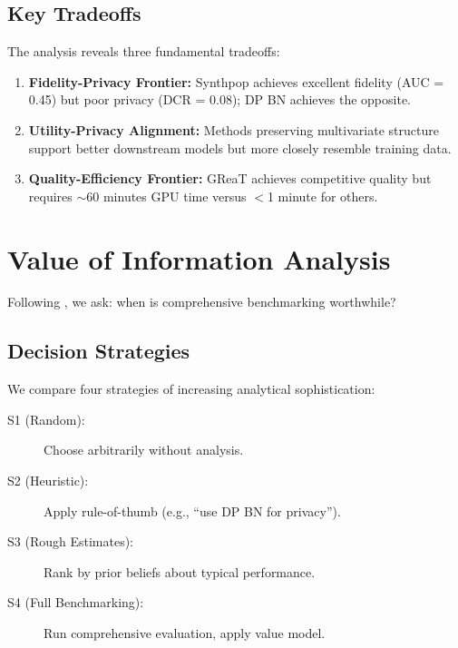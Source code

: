 \documentclass[12pt,a4paper]{article}
\begin{document}
\subsection{Key Tradeoffs}

The analysis reveals three fundamental tradeoffs:

\begin{enumerate}
    \item \textbf{Fidelity-Privacy Frontier:} Synthpop achieves excellent fidelity (AUC = 0.45) but poor privacy (DCR = 0.08); DP BN achieves the opposite.
    
    \item \textbf{Utility-Privacy Alignment:} Methods preserving multivariate structure support better downstream models but more closely resemble training data.
    
    \item \textbf{Quality-Efficiency Frontier:} GReaT achieves competitive quality but requires $\sim$60 minutes GPU time versus $<$1 minute for others.
\end{enumerate}

\section{Value of Information Analysis}

Following \citet{keisler2004value}, we ask: when is comprehensive benchmarking worthwhile?

\subsection{Decision Strategies}

We compare four strategies of increasing analytical sophistication:
\begin{description}
    \item[S1 (Random):] Choose arbitrarily without analysis.
    \item[S2 (Heuristic):] Apply rule-of-thumb (e.g., ``use DP BN for privacy'').
    \item[S3 (Rough Estimates):] Rank by prior beliefs about typical performance.
    \item[S4 (Full Benchmarking):] Run comprehensive evaluation, apply value model.
\end{description}
\end{document}
